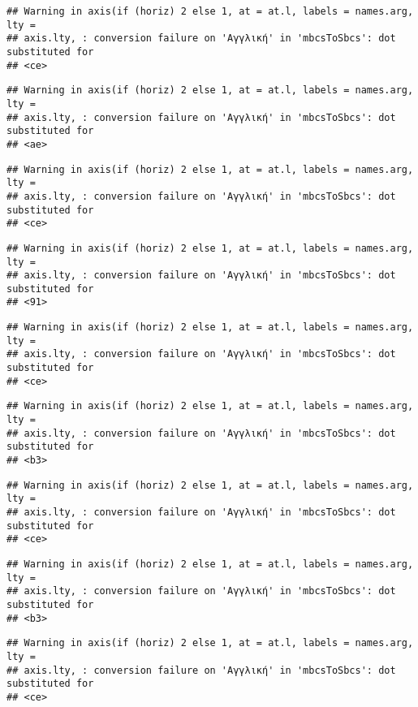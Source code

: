 \documentclass[
]{article}
\begin{document}
\begin{verbatim}
## Warning in axis(if (horiz) 2 else 1, at = at.l, labels = names.arg, lty =
## axis.lty, : conversion failure on 'Αγγλική' in 'mbcsToSbcs': dot substituted for
## <ce>
\end{verbatim}

\begin{verbatim}
## Warning in axis(if (horiz) 2 else 1, at = at.l, labels = names.arg, lty =
## axis.lty, : conversion failure on 'Αγγλική' in 'mbcsToSbcs': dot substituted for
## <ae>
\end{verbatim}

\begin{verbatim}
## Warning in axis(if (horiz) 2 else 1, at = at.l, labels = names.arg, lty =
## axis.lty, : conversion failure on 'Αγγλική' in 'mbcsToSbcs': dot substituted for
## <ce>
\end{verbatim}

\begin{verbatim}
## Warning in axis(if (horiz) 2 else 1, at = at.l, labels = names.arg, lty =
## axis.lty, : conversion failure on 'Αγγλική' in 'mbcsToSbcs': dot substituted for
## <91>
\end{verbatim}

\begin{verbatim}
## Warning in axis(if (horiz) 2 else 1, at = at.l, labels = names.arg, lty =
## axis.lty, : conversion failure on 'Αγγλική' in 'mbcsToSbcs': dot substituted for
## <ce>
\end{verbatim}

\begin{verbatim}
## Warning in axis(if (horiz) 2 else 1, at = at.l, labels = names.arg, lty =
## axis.lty, : conversion failure on 'Αγγλική' in 'mbcsToSbcs': dot substituted for
## <b3>
\end{verbatim}

\begin{verbatim}
## Warning in axis(if (horiz) 2 else 1, at = at.l, labels = names.arg, lty =
## axis.lty, : conversion failure on 'Αγγλική' in 'mbcsToSbcs': dot substituted for
## <ce>
\end{verbatim}

\begin{verbatim}
## Warning in axis(if (horiz) 2 else 1, at = at.l, labels = names.arg, lty =
## axis.lty, : conversion failure on 'Αγγλική' in 'mbcsToSbcs': dot substituted for
## <b3>
\end{verbatim}

\begin{verbatim}
## Warning in axis(if (horiz) 2 else 1, at = at.l, labels = names.arg, lty =
## axis.lty, : conversion failure on 'Αγγλική' in 'mbcsToSbcs': dot substituted for
## <ce>
\end{verbatim}
\end{document}

